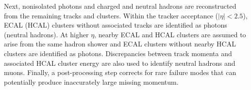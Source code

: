 Next, nonisolated photons and charged and neutral hadrons are reconstructed from the remaining tracks and clusters. Within the tracker acceptance ($|\eta|<2.5$), ECAL (HCAL) clusters without associated tracks are identified as photons (neutral hadrons). At higher $\eta$, nearby ECAL and HCAL clusters are assumed to arise from the same hadron shower and ECAL clusters without nearby HCAL clusters are identified as photons. Discrepancies between track momenta and associated HCAL cluster energy are also used to identify neutral hadrons and muons. Finally, a post-processing step corrects for rare failure modes that can potentially produce inaccurately large missing momentum.


